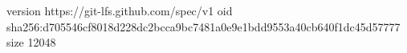 version https://git-lfs.github.com/spec/v1
oid sha256:d705546cf8018d228dc2bcca9bc7481a0e9e1bdd9553a40cb640f1dc45d57777
size 12048
